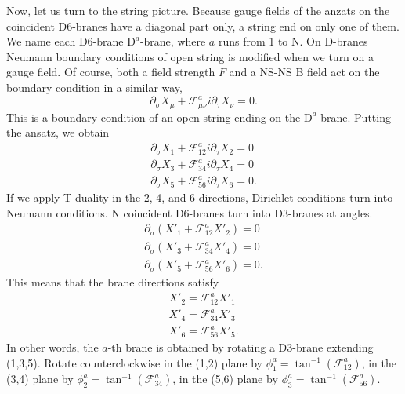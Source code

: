 \documentclass[a4paper,12pt]{article}
\begin{document}
Now, let us turn to the string picture. Because gauge fields of the anzats on the coincident D6-branes have a diagonal part only, a string end on only one of them. We name each D6-brane $\mbox{D}^a$-brane, where $a$ runs from 1 to N. On D-branes Neumann boundary conditions of open string is modified when we turn on a gauge field. Of course, both a field strength $F$ and a NS-NS B field act on the boundary condition in a similar way,
\[ \partial_{\sigma} X_{\mu} +  \mathcal{F}_{\mu\nu}^a i \partial_\tau X_{\nu} = 0.\]
This is a boundary condition of an open string ending on the $\mbox{D}^a$-brane.  Putting the ansatz, we obtain
\begin{eqnarray}
\partial_{\sigma} X_1 +  \mathcal{F}_{12}^a i \partial_\tau X_{2} = 0 \nonumber \\
\partial_{\sigma} X_3 +  \mathcal{F}_{34}^a i \partial_\tau X_{4} = 0 \nonumber \\
\partial_{\sigma} X_5 +  \mathcal{F}_{56}^a i \partial_\tau X_{6} = 0. \nonumber
\end{eqnarray}
If we apply T-duality in the 2, 4, and 6 directions, Dirichlet conditions turn into Neumann conditions. N coincident D6-branes turn into D3-branes at angles.
\begin{eqnarray}
\partial_{\sigma}( X'_1 +  \mathcal{F}_{12}^aX'_{2}) = 0 \nonumber \\
\partial_{\sigma}( X'_3 +  \mathcal{F}_{34}^aX'_{4}) = 0 \nonumber \\
\partial_{\sigma}( X'_5 +  \mathcal{F}_{56}^aX'_{6}) = 0. \nonumber
\end{eqnarray}
This means that the brane directions satisfy
\begin{eqnarray}
X'_2=  \mathcal{F}_{12}^aX'_1 \nonumber \\
X'_4=  \mathcal{F}_{34}^aX'_3 \nonumber \\
X'_6=  \mathcal{F}_{56}^aX'_5. \nonumber 
\end{eqnarray}
In other words, the $a$-th brane is obtained by rotating a D3-brane extending (1,3,5). Rotate counterclockwise in the (1,2) plane by $\phi_1^a = \tan^{-1}( \mathcal{F}_{12}^a) $, in the (3,4) plane by $\phi_2^a = \tan^{-1}( \mathcal{F}_{34}^a) $, in the (5,6) plane by $\phi_3^a = \tan^{-1}( \mathcal{F}_{56}^a) $.
\end{document}
